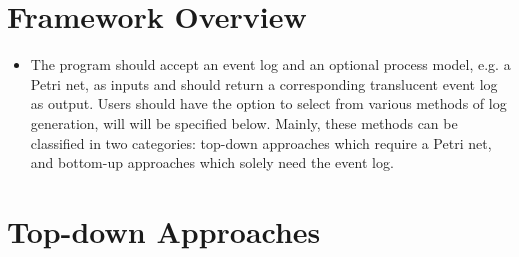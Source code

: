 \begin{comment}
    Describe the method/idea/algorithm in this chapter.
    Rename this chapter to a more meaningful name, given your topic.

    The best possible Method chapter is fairly easy, it has the following sections:
    \begin{enumerate}
        \item Overview; You provide an overview of the approach. You do so by showing a graphical example of the main steps (usually 2-3 steps).
        For each step, you clearly indicate the inputs and the outputs of the step. Let's assume we have Step 1, 2 and 3; guess what the next sections are\dots
        \item Step 1 (obviously a fancier name)
        \item Step 2 (obviously a fancier name)
        \item Step 3 (obviously a fancier name)
    \end{enumerate}
    Describing the steps is very similar to the difficult mathematical concepts.
    First describe an informal description of what the step does.
    Then provide supporting definitions, theorems and proofs.
    Then show how this works on an example.
    In some cases, it helps to adopt a \enquote{running example} that you use throughout this section to clarify each step.
\end{comment}

\section{Framework Overview}

\begin{itemize}
    \item The program should accept an event log and an optional process model, e.g. a Petri net, as inputs and should return a corresponding translucent event log as output. Users should have the option to select from various methods of log generation, will will be specified below. Mainly, these methods can be classified in two categories: top-down approaches which require a Petri net, and bottom-up approaches which solely need the event log.
\end{itemize}

\section{Top-down Approaches}

